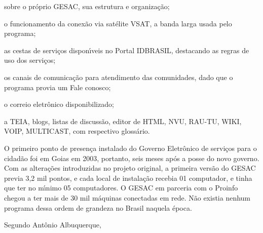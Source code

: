 \documentclass[
12pt,		%
openright,	%
twoside,  %
a4paper,			%
chapter=TITLE,		%
english,			%
french,				%
spanish,			%
brazil				%
]{USPSC-classe/USPSC}
\begin{document}
\begin{alineas}
\item sobre o pr\'oprio GESAC, sua estrutura e organiza\c{c}\~ao;
\item o funcionamento da conex\~ao via sat\'elite VSAT, a banda larga usada pelo programa;
\item as cestas de servi\c{c}os dispon\'{\i}veis no Portal IDBRASIL, destacando as regras de uso dos servi\c{c}os;
\item os canais de comunica\c{c}\~ao para atendimento das comunidades, dado que o programa provia um \textquotedbl Fale conosco\textquotedbl ;
\item  o correio eletr\^onico disponibilizado;
\item a TEIA, blogs, listas de discuss\~ao, editor de HTML, NVU, RAU-TU, WIKI, VOIP, MULTICAST, com respectivo gloss\'ario.
\end{alineas}


\noindent\begin{center}\mbox{\centering{}}\end{center}


O primeiro ponto de presen\c{c}a instalado do Governo Eletr\^onico de servi\c{c}os para o cidad\~ao foi em Goias em 2003, portanto, seis meses ap\'os a posse do novo governo. Com as altera\c{c}\~oes introduzidas no projeto original, a primeira vers\~ao do GESAC previa 3,2 mil pontos, e cada local de instala\c{c}\~ao recebia 01 computador, e tinha que ter no m\'{\i}nimo 05 computadores. O GESAC em parceria com o Proinfo chegou a ter mais de 30 mil m\'aquinas conectadas em rede. N\~ao existia nenhum programa dessa ordem de grandeza no Brasil naquela \'epoca.










Segundo Ant\^onio Albuquerque,
\end{document}
